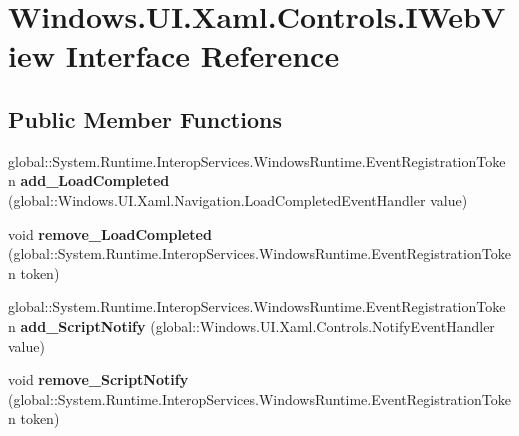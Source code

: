 \hypertarget{interface_windows_1_1_u_i_1_1_xaml_1_1_controls_1_1_i_web_view}{}\section{Windows.\+U\+I.\+Xaml.\+Controls.\+I\+Web\+View Interface Reference}
\label{interface_windows_1_1_u_i_1_1_xaml_1_1_controls_1_1_i_web_view}
\subsection*{Public Member Functions}
\begin{DoxyCompactItemize}
\item 
\mbox{\label{interface_windows_1_1_u_i_1_1_xaml_1_1_controls_1_1_i_web_view_a13cd0995f18f6d179d71abd176ff1dba}} 
global\+::\+System.\+Runtime.\+Interop\+Services.\+Windows\+Runtime.\+Event\+Registration\+Token {\bfseries add\+\_\+\+Load\+Completed} (global\+::\+Windows.\+U\+I.\+Xaml.\+Navigation.\+Load\+Completed\+Event\+Handler value)
\item 
\mbox{\label{interface_windows_1_1_u_i_1_1_xaml_1_1_controls_1_1_i_web_view_af38e4aa4ca0e989fc46d0f629fd7564e}} 
void {\bfseries remove\+\_\+\+Load\+Completed} (global\+::\+System.\+Runtime.\+Interop\+Services.\+Windows\+Runtime.\+Event\+Registration\+Token token)
\item 
\mbox{\label{interface_windows_1_1_u_i_1_1_xaml_1_1_controls_1_1_i_web_view_aadb8186d118d49d86ee192f2534cac58}} 
global\+::\+System.\+Runtime.\+Interop\+Services.\+Windows\+Runtime.\+Event\+Registration\+Token {\bfseries add\+\_\+\+Script\+Notify} (global\+::\+Windows.\+U\+I.\+Xaml.\+Controls.\+Notify\+Event\+Handler value)
\item 
\mbox{\label{interface_windows_1_1_u_i_1_1_xaml_1_1_controls_1_1_i_web_view_a9bb7e1887eef12d9c592c4b27677ac47}} 
void {\bfseries remove\+\_\+\+Script\+Notify} (global\+::\+System.\+Runtime.\+Interop\+Services.\+Windows\+Runtime.\+Event\+Registration\+Token token)
\item 

\end{DoxyCompactItemize}
